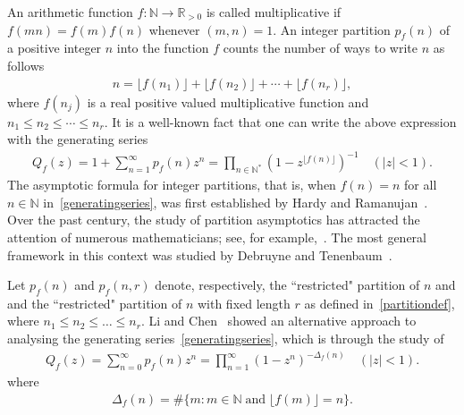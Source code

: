 \documentclass[12pt, oneside,reqno]{amsart}
\numberwithin{equation}{section}
\begin{document}
An arithmetic function $f:\mathbb{N}\to\mathbb{R}_{>0}$ is called multiplicative if $f(mn)=f(m)f(n)$ whenever $(m,n)=1$. An integer partition $p_f(n)$ of a positive integer $n$ into the function $f$ counts the number of ways to write $n$ as follows
\begin{align}\label{partitiondef}
n=\lfloor{f(n_1)}\rfloor+\lfloor{f(n_2)}\rfloor+\cdots+\lfloor{f(n_r)}\rfloor ,   
\end{align}
where $f(n_j)$ is a real positive valued multiplicative function and $n_1\leq n_2\leq\cdots\leq n_r$. It is a well-known fact that one can write the above expression with the generating series 
\begin{align}\label{generatingseries}
{Q_{f}}(z) 
=1+\sum_{n=1}^{\infty}{{p_{f}}(n){z^n}}  
=\prod_{n\in\mathbb{N}^{*}} (1-z^{\lfloor{f(n)}\rfloor})^{-1} \quad (|z|<1).
\end{align}
\noindent
The asymptotic formula for integer partitions, that is, when $f(n)=n$ for all $n\in\mathbb{N}$ in~\eqref{generatingseries}, was first established by Hardy and Ramanujan~\cite{hardyramanujan}. Over the past century, the study of partition asymptotics has attracted the attention of numerous mathematicians; see, for example,~\cite{taylor,madhu,semiprime,vaughan}. The most general framework in this context was studied by Debruyne and Tenenbaum~\cite{debten}.

\medskip

Let $p_{f}(n)$ and $p_{f}(n,r)$ denote, respectively, the ``restricted" partition of $n$ and and the ``restricted" partition of $n$ with fixed length $r$ as defined in~\eqref{partitiondef}, where $n_1\leq n_2\leq\ldots\leq n_r$. Li and Chen~\cite[Theorem 1.1]{lichen2} showed
an alternative approach to analysing the generating series~\eqref{generatingseries}, which is through the study of
\begin{align}\label{generatingserieswithgapfunction}
Q_f(z)
=\sum_{n=0}^{\infty}p_f(n)z^n
=\prod_{n=1}^{\infty}(1-z^n)^{-\Delta_f(n)}\quad (|z|<1).
\end{align}
where 
\begin{align}\label{gnsetdefinition}
\Delta_f(n)=\#\{m: m\in\mathbb{N}\;\text{and}\;\lfloor{
f(m)}\rfloor=n\}. 
\end{align}

\end{document}
